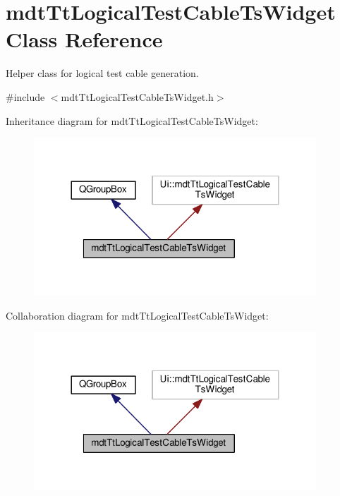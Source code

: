 \hypertarget{classmdt_tt_logical_test_cable_ts_widget}{\section{mdt\-Tt\-Logical\-Test\-Cable\-Ts\-Widget Class Reference}
\label{classmdt_tt_logical_test_cable_ts_widget}
}


Helper class for logical test cable generation.  




{\ttfamily \#include $<$mdt\-Tt\-Logical\-Test\-Cable\-Ts\-Widget.\-h$>$}



Inheritance diagram for mdt\-Tt\-Logical\-Test\-Cable\-Ts\-Widget\-:\nopagebreak
\begin{figure}[H]
\begin{center}
\leavevmode
\includegraphics[width=300pt]{classmdt_tt_logical_test_cable_ts_widget__inherit__graph}
\end{center}
\end{figure}


Collaboration diagram for mdt\-Tt\-Logical\-Test\-Cable\-Ts\-Widget\-:\nopagebreak
\begin{figure}[H]
\begin{center}
\leavevmode
\includegraphics[width=300pt]{classmdt_tt_logical_test_cable_ts_widget__coll__graph}
\end{center}
\end{figure}
